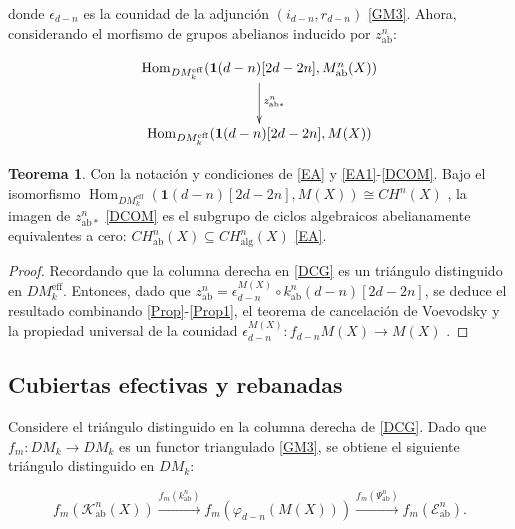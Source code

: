 \documentclass[10pt]{amsart}
\theoremstyle{definition}
\newtheorem{theorem}[definition]{Teorema}
\theoremstyle{remark}
\theoremstyle{definition}
\begin{document}
donde $\epsilon_{d-n}$ es la counidad de la adjunción $(i_{d-n},r_{d-n})$ \ref{GM3}. Ahora, considerando el morfismo de grupos abelianos inducido por $z^{n}_{\mathrm{ab}}$:

\begin{equation}
\xymatrix@R=10mm{ 
\operatorname{Hom}_{DM_{k}^{\mathrm{eff}}}(\mathbf{1}(d-n)[2d-2n],M_{\mathrm{ab}}^{n}(X))
\ar@{->}[d]^{z_{\mathrm{ab*}}^{n}}\\
\operatorname{Hom}_{DM_{k}^{\mathrm{eff}}}(\mathbf{1}(d-n)[2d-2n],M(X))
}
\label{DCOM}
\end{equation}




\begin{theorem}\label{TP3}
Con la notación y condiciones de \ref{EA} y \ref{EA1}-\ref{DCOM}. Bajo el isomorfismo $\operatorname{Hom}_{DM^{\mathrm{eff}}_{k}}(\mathbf{1}(d-n)[2d-2n],M(X))\cong CH^{n}(X)$ \cite[Prop. 2.1.4, Thm. 3.2.6]{Voe00b}, la imagen de $z^{n}_{\mathrm{ab*}}$ \ref{DCOM} es el subgrupo de ciclos algebraicos abelianamente equivalentes a cero: $CH^{n}_{\mathrm{ab}}(X)\subseteq CH^{n}_{\mathrm{alg}}(X)$ \ref{EA}.
\end{theorem}

\begin{proof}
Recordando que la columna derecha en \ref{DCG} es un triángulo distinguido en $DM^{\mathrm{eff}}_{k}$. Entonces, dado que $z^{n}_{\mathrm{ab}}=\epsilon^{M(X)}_{d-n}\circ k^{n}_{\mathrm{ab}}(d-n)[2d-2n]$, se deduce el resultado combinando \ref{Prop}-\ref{Prop1}, el teorema de cancelación de Voevodsky \cite{Voe10a} y la propiedad universal de la counidad $\epsilon^{M(X)}_{d-n}:f_{d-n}M(X)\to M(X)$ \cite[3.3.1]{Pel17}.
\end{proof}

\subsection{Cubiertas efectivas y rebanadas}

Considere el triángulo distinguido en la columna derecha de \ref{DCG}. Dado que $f_{m}:DM_{k}\to DM_{k}$ es un functor triangulado \ref{GM3}, se obtiene el siguiente triángulo distinguido en $DM_{k}$:

\begin{equation}\label{TD}
f_{m}(\mathcal{K}^{n}_{\mathrm{ab}}(X))\xrightarrow{f_{m}(k^{n}_{\mathrm{ab}})}f_{m}(\varphi_{d-n}(M(X)))\xrightarrow{f_{m}(\Psi^{n}_{\mathrm{ab}})}f_{m}(\mathcal{E}^{n}_{\mathrm{ab}}).
\end{equation}
\end{document}
